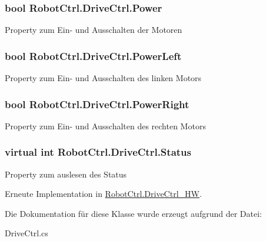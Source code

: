 \hypertarget{class_robot_ctrl_1_1_drive_ctrl_aef1505229ec4f37b5cc69377360c3f2a}{
\subsubsection[{Power}]{\setlength{\rightskip}{0pt plus 5cm}bool RobotCtrl.DriveCtrl.Power}}
\label{class_robot_ctrl_1_1_drive_ctrl_aef1505229ec4f37b5cc69377360c3f2a}
Property zum Ein-\/ und Ausschalten der Motoren \hypertarget{class_robot_ctrl_1_1_drive_ctrl_af59bc9fd9c92f7bae49654588693673a}{
\subsubsection[{PowerLeft}]{\setlength{\rightskip}{0pt plus 5cm}bool RobotCtrl.DriveCtrl.PowerLeft}}
\label{class_robot_ctrl_1_1_drive_ctrl_af59bc9fd9c92f7bae49654588693673a}
Property zum Ein-\/ und Ausschalten des linken Motors \hypertarget{class_robot_ctrl_1_1_drive_ctrl_a7fa4a69b83012c16657c9f88a0637754}{
\subsubsection[{PowerRight}]{\setlength{\rightskip}{0pt plus 5cm}bool RobotCtrl.DriveCtrl.PowerRight}}
\label{class_robot_ctrl_1_1_drive_ctrl_a7fa4a69b83012c16657c9f88a0637754}
Property zum Ein-\/ und Ausschalten des rechten Motors \hypertarget{class_robot_ctrl_1_1_drive_ctrl_a462a4b74b24efb494df863d1ac249b45}{
\subsubsection[{Status}]{\setlength{\rightskip}{0pt plus 5cm}virtual int RobotCtrl.DriveCtrl.Status}}
\label{class_robot_ctrl_1_1_drive_ctrl_a462a4b74b24efb494df863d1ac249b45}
Property zum auslesen des Status 

Erneute Implementation in \hyperlink{class_robot_ctrl_1_1_drive_ctrl___h_w_ab77cfbe90640881ca1e051fab36f02ac}{RobotCtrl.DriveCtrl\_\-HW}.



Die Dokumentation für diese Klasse wurde erzeugt aufgrund der Datei:\begin{DoxyCompactItemize}
\item 
DriveCtrl.cs\end{DoxyCompactItemize}
